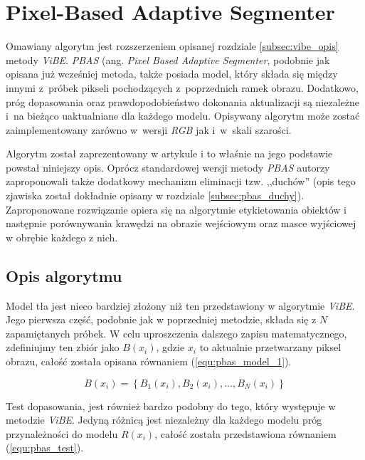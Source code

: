 \section{Pixel-Based Adaptive Segmenter}
\label{sec:pbas_teoria}

Omawiany algorytm jest rozszerzeniem opisanej rozdziale \ref{subsec:vibe_opis} metody \textit{ViBE}. 
\textit{PBAS} (ang. \textit{Pixel Based Adaptive Segmenter}, podobnie jak opisana już wcześniej metoda, także posiada model, który składa się między innymi z~próbek pikseli pochodzących z~poprzednich ramek obrazu. 
Dodatkowo, próg dopasowania oraz prawdopodobieństwo dokonania aktualizacji są niezależne i~na bieżąco uaktualniane dla każdego modelu. 
Opisywany algorytm może zostać zaimplementowany zarówno w~wersji \textit{RGB} jak i~w~skali szarości.

Algorytm został zaprezentowany w artykule \cite{kryjak_14_pbas} i to właśnie na jego podstawie powstał niniejszy opis. 
Oprócz standardowej wersji metody \textit{PBAS} autorzy zaproponowali także dodatkowy mechanizm eliminacji tzw. ,,duchów'' (opis tego zjawiska został dokładnie opisany w rozdziale \ref{subsec:pbas_duchy}). 
Zaproponowane rozwiązanie opiera się na algorytmie etykietowania obiektów i następnie porównywania krawędzi na obrazie wejściowym oraz masce wyjściowej w obrębie każdego z nich.


\subsection{Opis algorytmu}
\label{subsec:pbas_opis}

Model tła jest nieco bardziej złożony niż ten przedstawiony w algorytmie \textit{ViBE}. 
Jego pierwsza część, podobnie jak w poprzedniej metodzie, składa się z $N$ zapamiętanych próbek. 
W celu uproszczenia dalszego zapisu matematycznego, zdefiniujmy ten zbiór jako $B(x_i)$, gdzie $x_i$ to aktualnie przetwarzany piksel obrazu, całość została opisana równaniem (\ref{equ:pbas_model_1}).

	\begin{equation}
		B(x_i)= \left\{ B_1(x_i), B_2(x_i), \dotsc, B_N(x_i) \right\}
	\label{equ:pbas_model_1}	
	\end{equation}

Test dopasowania, jest również bardzo podobny do tego, który występuje w metodzie \textit{ViBE}. 
Jedyną różnicą jest niezależny dla każdego modelu próg przynależności do modelu $R(x_i)$, całość została przedstawiona równaniem (\ref{equ:pbas_test}).

